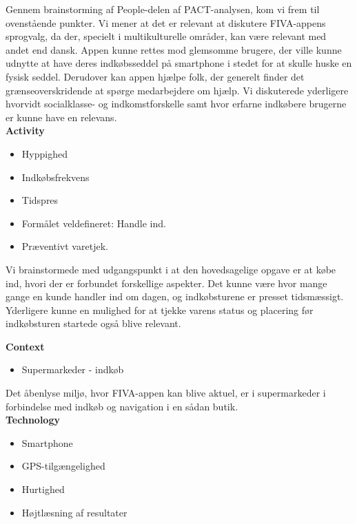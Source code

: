 \documentclass[12pt]{article}
\begin{document}
\noindent Gennem brainstorming af People-delen af PACT-analysen, kom vi frem til ovenstående punkter. Vi mener at det er relevant at diskutere FIVA-appens sprogvalg, da der, specielt i multikulturelle områder, kan være relevant med andet end dansk. Appen kunne rettes mod glemsomme brugere, der ville kunne udnytte at have deres indkøbsseddel på smartphone i stedet for at skulle huske en fysisk seddel. Derudover kan appen hjælpe folk, der generelt finder det grænseoverskridende at spørge medarbejdere om hjælp. Vi diskuterede yderligere hvorvidt socialklasse- og indkomstforskelle samt hvor erfarne indkøbere brugerne er kunne have en relevans.\\

\noindent \textbf{Activity} 
\begin{itemize}
\item Hyppighed 
\item Indkøbsfrekvens  
\item Tidspres
\item Formålet veldefineret: Handle ind.
\item Præventivt varetjek.\\
\end{itemize}

\noindent Vi brainstormede med udgangspunkt i at den hovedsagelige opgave er at købe ind, hvori der er forbundet forskellige aspekter. Det kunne være hvor mange gange en kunde handler ind om dagen, og indkøbsturene er presset tidsmæssigt. Yderligere kunne en mulighed for at tjekke varens status og placering før indkøbsturen startede også blive relevant.\\

\newpage

\noindent \textbf{Context}
\begin{itemize}
\item Supermarkeder - indkøb\\
\end{itemize}

\noindent Det åbenlyse miljø, hvor FIVA-appen kan blive aktuel, er i supermarkeder i forbindelse med indkøb og navigation i en sådan butik.\\

\noindent \textbf{Technology}
\begin{itemize}
\item Smartphone 
\item GPS-tilgængelighed
\item Hurtighed
\item Højtlæsning af resultater\\
\end{itemize}
\end{document}
